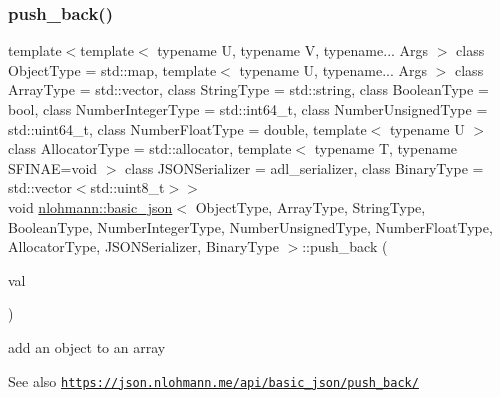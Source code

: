 \subsubsection{\texorpdfstring{push\+\_\+back()}{push\_back()}\hspace{0.1cm}{\footnotesize\ttfamily [1/4]}}
{\footnotesize\ttfamily template$<$template$<$ typename U, typename V, typename... Args $>$ class Object\+Type = std\+::map, template$<$ typename U, typename... Args $>$ class Array\+Type = std\+::vector, class String\+Type  = std\+::string, class Boolean\+Type  = bool, class Number\+Integer\+Type  = std\+::int64\+\_\+t, class Number\+Unsigned\+Type  = std\+::uint64\+\_\+t, class Number\+Float\+Type  = double, template$<$ typename U $>$ class Allocator\+Type = std\+::allocator, template$<$ typename T, typename S\+F\+I\+N\+A\+E=void $>$ class J\+S\+O\+N\+Serializer = adl\+\_\+serializer, class Binary\+Type  = std\+::vector$<$std\+::uint8\+\_\+t$>$$>$ \\
void \hyperlink{classnlohmann_1_1basic__json}{nlohmann\+::basic\+\_\+json}$<$ Object\+Type, Array\+Type, String\+Type, Boolean\+Type, Number\+Integer\+Type, Number\+Unsigned\+Type, Number\+Float\+Type, Allocator\+Type, J\+S\+O\+N\+Serializer, Binary\+Type $>$\+::push\+\_\+back (\begin{DoxyParamCaption}\item[{\hyperlink{classnlohmann_1_1basic__json}{basic\+\_\+json}$<$ Object\+Type, Array\+Type, String\+Type, Boolean\+Type, Number\+Integer\+Type, Number\+Unsigned\+Type, Number\+Float\+Type, Allocator\+Type, J\+S\+O\+N\+Serializer, Binary\+Type $>$ \&\&}]{val }\end{DoxyParamCaption})\hspace{0.3cm}{\ttfamily [inline]}}



add an object to an array 

\begin{DoxySeeAlso}{See also}
\href{https://json.nlohmann.me/api/basic_json/push_back/}{\tt https\+://json.\+nlohmann.\+me/api/basic\+\_\+json/push\+\_\+back/} 
\end{DoxySeeAlso}
\mbox{\label{classnlohmann_1_1basic__json_a3405d38087e13994a5a4556065b0be6d}} 
